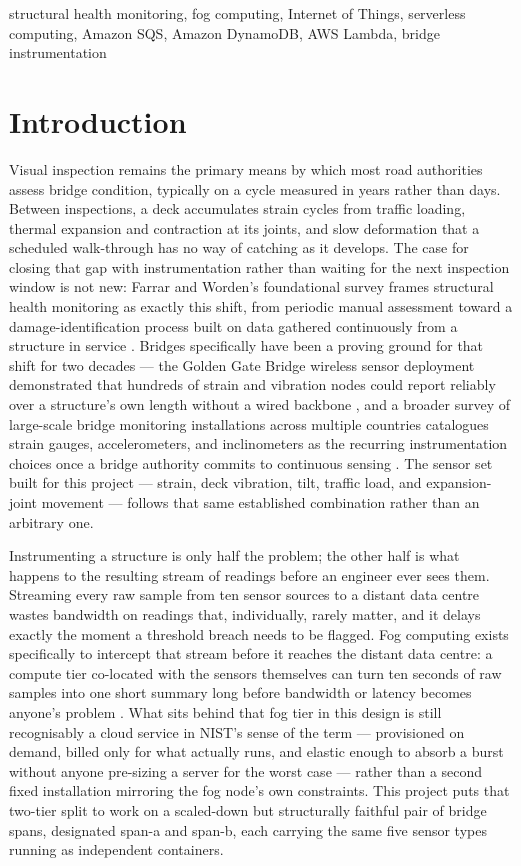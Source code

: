 \documentclass[conference]{IEEEtran}
\begin{document}
\begin{IEEEkeywords}
structural health monitoring, fog computing, Internet of Things, serverless computing, Amazon SQS, Amazon DynamoDB, AWS Lambda, bridge instrumentation
\end{IEEEkeywords}

\section{Introduction}

Visual inspection remains the primary means by which most road authorities assess bridge condition, typically on a cycle measured in years rather than days. Between inspections, a deck accumulates strain cycles from traffic loading, thermal expansion and contraction at its joints, and slow deformation that a scheduled walk-through has no way of catching as it develops. The case for closing that gap with instrumentation rather than waiting for the next inspection window is not new: Farrar and Worden's foundational survey frames structural health monitoring as exactly this shift, from periodic manual assessment toward a damage-identification process built on data gathered continuously from a structure in service \cite{ref1}. Bridges specifically have been a proving ground for that shift for two decades --- the Golden Gate Bridge wireless sensor deployment demonstrated that hundreds of strain and vibration nodes could report reliably over a structure's own length without a wired backbone \cite{ref2}, and a broader survey of large-scale bridge monitoring installations across multiple countries catalogues strain gauges, accelerometers, and inclinometers as the recurring instrumentation choices once a bridge authority commits to continuous sensing \cite{ref3}. The sensor set built for this project --- strain, deck vibration, tilt, traffic load, and expansion-joint movement --- follows that same established combination rather than an arbitrary one.

Instrumenting a structure is only half the problem; the other half is what happens to the resulting stream of readings before an engineer ever sees them. Streaming every raw sample from ten sensor sources to a distant data centre wastes bandwidth on readings that, individually, rarely matter, and it delays exactly the moment a threshold breach needs to be flagged. Fog computing exists specifically to intercept that stream before it reaches the distant data centre: a compute tier co-located with the sensors themselves can turn ten seconds of raw samples into one short summary long before bandwidth or latency becomes anyone's problem \cite{ref5}. What sits behind that fog tier in this design is still recognisably a cloud service in NIST's sense of the term --- provisioned on demand, billed only for what actually runs, and elastic enough to absorb a burst without anyone pre-sizing a server for the worst case \cite{ref4} --- rather than a second fixed installation mirroring the fog node's own constraints. This project puts that two-tier split to work on a scaled-down but structurally faithful pair of bridge spans, designated span-a and span-b, each carrying the same five sensor types running as independent containers.
\end{document}
